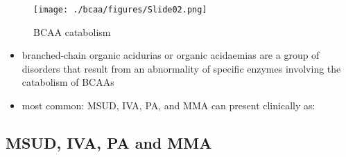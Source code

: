 \documentclass{scrartcl}
\begin{document}
\begin{figure}[htbp]
\centering
\texttt{[image: ./bcaa/figures/Slide02.png]}
\caption{\label{fig:orgbfb1699}
BCAA catabolism}
\end{figure}

\begin{itemize}
\item branched-chain organic acidurias or organic acidaemias are a group
of disorders that result from an abnormality of specific enzymes
involving the catabolism of BCAAs
\item most common: MSUD, IVA, PA, and MMA can present clinically as:
\end{itemize}

\subsection{MSUD, IVA, PA and MMA}
\label{sec:org4bd8a0c}
\end{document}
